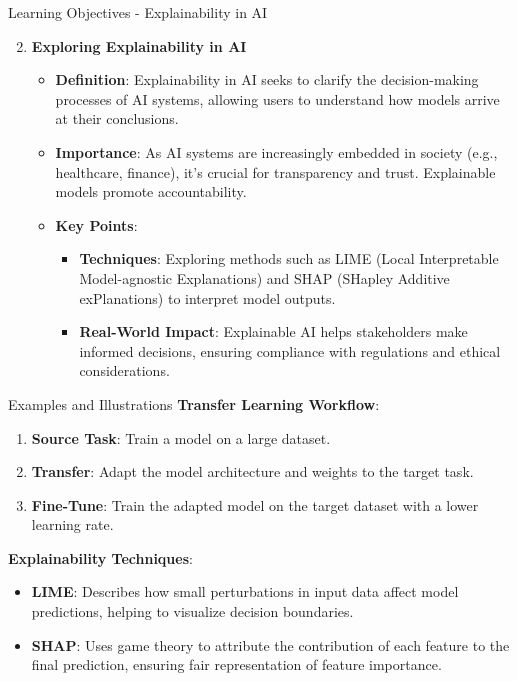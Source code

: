 \documentclass[aspectratio=169]{beamer}
\begin{document}
\begin{frame}[fragile]{Learning Objectives - Explainability in AI}
  \begin{enumerate}
    \setcounter{enumi}{1} %
    \item \textbf{Exploring Explainability in AI}
      \begin{itemize}
        \item \textbf{Definition}: 
          Explainability in AI seeks to clarify the decision-making processes of AI systems, allowing users to understand how models arrive at their conclusions.
        \item \textbf{Importance}: 
          As AI systems are increasingly embedded in society (e.g., healthcare, finance), it's crucial for transparency and trust. Explainable models promote accountability.
        \item \textbf{Key Points}:
          \begin{itemize}
            \item \textbf{Techniques}: Exploring methods such as LIME (Local Interpretable Model-agnostic Explanations) and SHAP (SHapley Additive exPlanations) to interpret model outputs.
            \item \textbf{Real-World Impact}: Explainable AI helps stakeholders make informed decisions, ensuring compliance with regulations and ethical considerations.
          \end{itemize}
      \end{itemize}
  \end{enumerate}
\end{frame}

\begin{frame}[fragile]{Examples and Illustrations}
  \textbf{Transfer Learning Workflow}:
  \begin{enumerate}
    \item \textbf{Source Task}: Train a model on a large dataset.
    \item \textbf{Transfer}: Adapt the model architecture and weights to the target task.
    \item \textbf{Fine-Tune}: Train the adapted model on the target dataset with a lower learning rate.
  \end{enumerate}

  \textbf{Explainability Techniques}:
  \begin{itemize}
    \item \textbf{LIME}: Describes how small perturbations in input data affect model predictions, helping to visualize decision boundaries.
    \item \textbf{SHAP}: Uses game theory to attribute the contribution of each feature to the final prediction, ensuring fair representation of feature importance.
  \end{itemize}
\end{frame}
\end{document}
